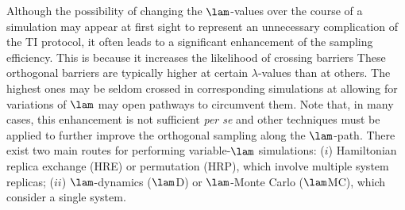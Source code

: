 Although the possibility of changing the $\lam$-values over the course of a simulation may appear at first sight to represent an unnecessary complication of the TI protocol, it often leads to a significant enhancement of the sampling efficiency. This is because it increases the likelihood of crossing barriers 
%
These orthogonal barriers are typically higher at certain $\lambda$-values than at others. 
The highest ones may be seldom crossed in corresponding simulations at 
allowing for variations of $\lam$ may open pathways to circumvent them. Note that, in many cases, this enhancement is not sufficient \textit{per se} and other techniques must be applied to further 
improve the orthogonal sampling 
%
along the $\lam$-path\cite{WO03.1,WO03.2,HR07.1,DE08.2,DE08.12,FA08.7,HR08.1,HR09.1,KH10.1,KH11.2,DO12.5,WA12.2,GA13.4,KA14.3,ME16.1}. 
%
There exist two main routes for performing variable-$\lam$ simulations:
($i$) Hamiltonian replica exchange (HRE) or permutation (HRP), which involve multiple system replicas;
($ii$) $\lam$-dynamics ($\lam$D) or $\lam$-Monte Carlo ($\lam$MC), which consider a single system.

